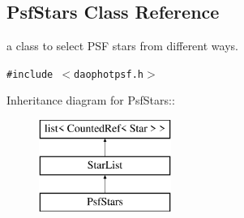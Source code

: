 \subsection{Psf\-Stars  Class Reference}
\label{class_psfstars}
a class to select PSF stars from different ways. 


{\tt \#include $<$daophotpsf.h$>$}

Inheritance diagram for Psf\-Stars::\begin{figure}[H]
\begin{center}
\leavevmode
\includegraphics[height=3cm]{class_psfstars}
\end{center}
\end{figure}
